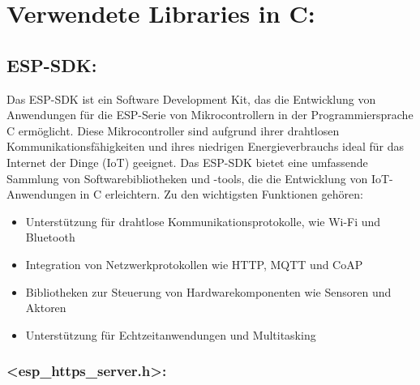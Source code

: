 \section{Verwendete Libraries in C:}
\subsection*{ESP-SDK:}
Das ESP-SDK ist ein Software Development Kit, das die Entwicklung von Anwendungen für die ESP-Serie von Mikrocontrollern in der Programmiersprache C ermöglicht.
Diese Mikrocontroller sind aufgrund ihrer drahtlosen Kommunikationsfähigkeiten und ihres niedrigen Energieverbrauchs ideal für das Internet der Dinge (IoT) geeignet. 
Das ESP-SDK bietet eine umfassende Sammlung von Softwarebibliotheken und -tools, die die Entwicklung von IoT-Anwendungen in C erleichtern. 
Zu den wichtigsten Funktionen gehören:

\begin{itemize}
    \item Unterstützung für drahtlose Kommunikationsprotokolle, wie Wi-Fi und Bluetooth
    \item Integration von Netzwerkprotokollen wie HTTP, MQTT und CoAP
    \item Bibliotheken zur Steuerung von Hardwarekomponenten wie Sensoren und Aktoren
    \item Unterstützung für Echtzeitanwendungen und Multitasking
\end{itemize}

\subsubsection*{<esp\_https\_server.h>:}

